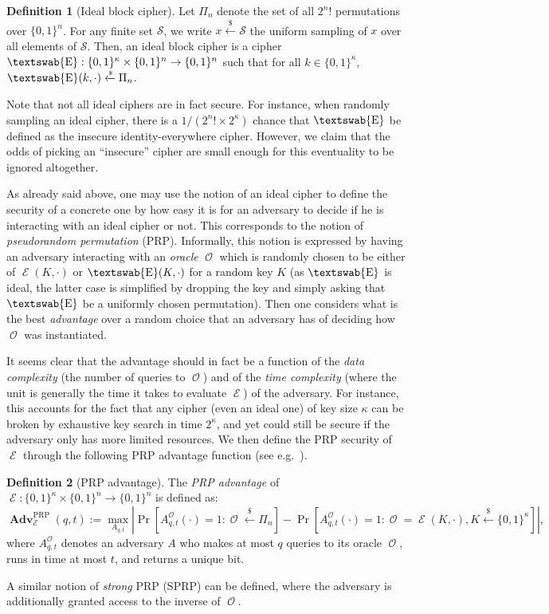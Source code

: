 \documentclass[11pt,a4paper]{article}
\theoremstyle{definition}
\newtheorem{defi}{Definition}
\DeclareMathOperator\E{\mathcal{E}}
\DeclareMathOperator\ora{\mathcal{O}}
\DeclareMathOperator\iE{\textswab{E}}
\DeclareMathOperator\Adv{\mathbf{Adv}}
\newcommand\msb{\{0,1\}^n}
\newcommand\ksb{\{0,1\}^\kappa}
\newcommand\allperms{\Pi_n}
\newcommand\randraw{\xleftarrow{{\scriptscriptstyle\$}}}
\begin{document}
\begin{defi}[Ideal block cipher]
\label{def:ic}
Let $\allperms$ denote the set of all $2^n!$ permutations over $\msb$. For any finite set $\mathcal{S}$, we write $x \randraw \mathcal{S}$
the uniform sampling of $x$ over all elements of $\mathcal{S}$. Then, an ideal block cipher is a cipher
$\iE : \ksb \times \msb \rightarrow \msb$ such that for all $k \in \ksb$, $\iE(k,\cdot) \randraw \allperms$.
\end{defi}

Note that not all ideal ciphers are in fact secure. For instance, when randomly sampling an ideal cipher,
there is a $1/(2^n!\times 2^\kappa)$ chance that $\iE$ be defined as the insecure identity-everywhere cipher. However, we claim
that the odds of picking an ``insecure'' cipher are small enough for this eventuality to be ignored altogether.

As already said above, one may use the notion of an ideal cipher to define the security of a concrete one by how easy it is for
an adversary to decide if he is interacting with an ideal cipher or not. This corresponds to the notion of
\emph{pseudorandom permutation} (PRP). Informally, this notion is expressed by having an adversary
interacting with an \emph{oracle} $\ora$ which is randomly chosen to be either of $\E(K,\cdot)$ or $\iE(K, \cdot)$
for a random key $K$ (as $\iE$ is ideal, the latter case is simplified by dropping the key and simply
asking that $\iE$ be a uniformly chosen permutation). Then one considers what is the best \emph{advantage} over a
random choice that an adversary has of deciding how $\ora$ was instantiated.

It seems clear that the advantage should in fact be a function of the \emph{data complexity} (the number of queries to
$\ora$) and of the \emph{time complexity} (where the unit is generally the time it takes to evaluate $\E$) of the adversary.
For instance, this accounts for the fact that any cipher (even an ideal one) of key size $\kappa$ can be broken by exhaustive key search
in time $2^\kappa$, and yet could still be secure if the adversary only has more limited resources.
We then define the PRP security of $\E$ through the following PRP advantage function (see e.g.~\cite{DBLP:journals/jcss/BellareKR00,bellare-rogaway_course}).

\begin{defi}[PRP advantage]
\label{def:prp}
The \emph{PRP advantage}  of $\E : \ksb \times \msb \rightarrow \msb$ is defined as:
\[
\Adv^\text{PRP}_{\E}(q,t) := \max_{A_{q,t}} \left|\Pr\left[A^{\ora}_{q,t}(\cdot) = 1 : \ora \randraw \allperms\right] -
\Pr\left[A^{\ora}_{q,t}(\cdot) = 1 : \ora = \E(K,\cdot), K \randraw \ksb\right]\right|,
\]
where $A^{\ora}_{q,t}$ denotes an adversary $A$ who makes at most $q$ queries to its oracle $\ora$, runs in time at most $t$, and returns a unique bit.

A similar notion of \emph{strong} PRP (SPRP) can be defined, where the adversary is additionally granted access to the inverse of $\ora$.
\end{defi}
\end{document}
